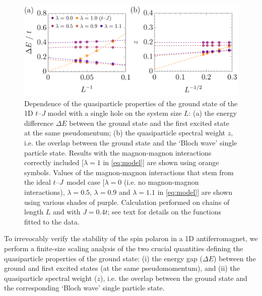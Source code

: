 \documentclass[%
 reprint,
 amsmath,amssymb,
 aps,
prl,
]{revtex4-1}
\begin{document}
\begin{figure}[t!]
    \includegraphics[width=\columnwidth]
    {fig_2}
  \caption{\color{red}Dependence of the quasiparticle properties of the ground state of the 1D $t$--$J$ model with a single hole on the system size $L$: (a) the energy difference $\Delta E$ between the ground state and the first excited state at the same pseudomentum; (b) the quasiparticle spectral weight $z$, i.e. the overlap between the ground state and the `Bloch wave' single particle state. Results with the magnon-magnon interactions correctly included [$\lambda=1$ in \eqref{eq:model}] are shown using orange symbols. Values of the magnon-magnon interactions that stem from the ideal $t$--$J$~model case [$\lambda=0$ (i.e. no magnon-magnon interactions), $\lambda=0.5$, $\lambda=0.9$ and $\lambda=1.1$ in \eqref{eq:model}] are shown using various shades of purple.
%
Calculation performed on chains of length $L$ and with  $J = 0.4t$; see text for details on the functions fitted to the data.
}
\label{fig:scaling}
\end{figure}

To irrevocably verify the stability of the spin polaron in a 1D antiferromagnet, 
we perform a finite-size scaling analysis of the two crucial quantities defining the quasiparticle properties of the ground state: (i) the energy gap ($\Delta E$) between the ground and first excited states (at the same pseudomomentum), and (ii) the quasiparticle spectral weight ($z$), i.e. the overlap between the ground state and the corresponding `Bloch wave’ single particle state. 
\end{document}
